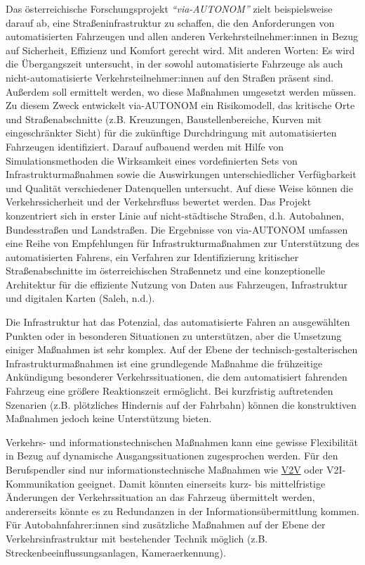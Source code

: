 \documentclass[
]{book}
\begin{document}
Das österreichische Forschungsprojekt \emph{``via-AUTONOM''} zielt beispielsweise darauf ab, eine Straßeninfrastruktur zu schaffen, die den Anforderungen von automatisierten Fahrzeugen und allen anderen Verkehrsteilnehmer:innen in Bezug auf Sicherheit, Effizienz und Komfort gerecht wird. Mit anderen Worten: Es wird die Übergangszeit untersucht, in der sowohl automatisierte Fahrzeuge als auch nicht-automatisierte Verkehrsteilnehmer:innen auf den Straßen präsent sind. Außerdem soll ermittelt werden, wo diese Maßnahmen umgesetzt werden müssen. Zu diesem Zweck entwickelt via-AUTONOM ein Risikomodell, das kritische Orte und Straßenabschnitte (z.B. Kreuzungen, Baustellenbereiche, Kurven mit eingeschränkter Sicht) für die zukünftige Durchdringung mit automatisierten Fahrzeugen identifiziert. Darauf aufbauend werden mit Hilfe von Simulationsmethoden die Wirksamkeit eines vordefinierten Sets von Infrastrukturmaßnahmen sowie die Auswirkungen unterschiedlicher Verfügbarkeit und Qualität verschiedener Datenquellen untersucht. Auf diese Weise können die Verkehrssicherheit und der Verkehrsfluss bewertet werden. Das Projekt konzentriert sich in erster Linie auf nicht-städtische Straßen, d.h. Autobahnen, Bundesstraßen und Landstraßen. Die Ergebnisse von via-AUTONOM umfassen eine Reihe von Empfehlungen für Infrastrukturmaßnahmen zur Unterstützung des automatisierten Fahrens, ein Verfahren zur Identifizierung kritischer Straßenabschnitte im österreichischen Straßennetz und eine konzeptionelle Architektur für die effiziente Nutzung von Daten aus Fahrzeugen, Infrastruktur und digitalen Karten (Saleh, n.d.).

Die Infrastruktur hat das Potenzial, das automatisierte Fahren an ausgewählten Punkten oder in besonderen Situationen zu unterstützen, aber die Umsetzung einiger Maßnahmen ist sehr komplex. Auf der Ebene der technisch-gestalterischen Infrastrukturmaßnahmen ist eine grundlegende Maßnahme die frühzeitige Ankündigung besonderer Verkehrssituationen, die dem automatisiert fahrenden Fahrzeug eine größere Reaktionszeit ermöglicht. Bei kurzfristig auftretenden Szenarien (z.B. plötzliches Hindernis auf der Fahrbahn) können die konstruktiven Maßnahmen jedoch keine Unterstützung bieten.

Verkehrs- und informationstechnischen Maßnahmen kann eine gewisse Flexibilität in Bezug auf dynamische Ausgangssituationen zugesprochen werden. Für den Berufspendler sind nur informationstechnische Maßnahmen wie \protect\hyperlink{v2x}{V2V} oder V2I-Kommunikation geeignet. Damit könnten einerseits kurz- bis mittelfristige Änderungen der Verkehrssituation an das Fahrzeug übermittelt werden, andererseits könnte es zu Redundanzen in der Informationsübermittlung kommen. Für Autobahnfahrer:innen sind zusätzliche Maßnahmen auf der Ebene der Verkehrsinfrastruktur mit bestehender Technik möglich (z.B. Streckenbeeinflussungsanlagen, Kameraerkennung).
\end{document}
